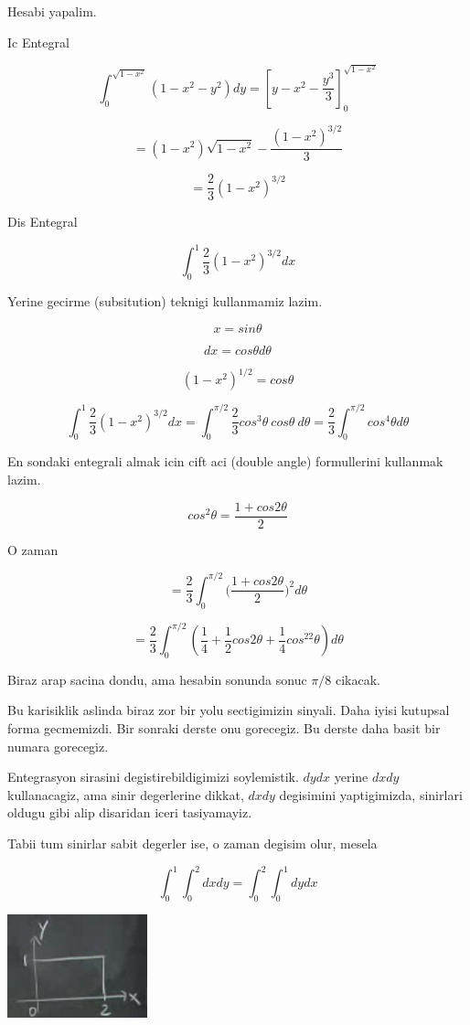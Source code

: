 \documentclass[12pt,fleqn]{article}
\begin{document}
Hesabi yapalim. 

Ic Entegral 

\[  \int_0^{\sqrt{1-x^2}}  (1-x^2-y^2) dy = 
[ y - x^2 - \frac{y^3}{3} ]_0^{\sqrt{1-x^2}}
 \]

\[ =  (1-x^2)\sqrt{1-x^2} - \frac{(1-x^2)^{3/2}}{3}\]

\[ = \frac{2}{3} (1-x^2)^{3/2} \]

Dis Entegral

\[ \int_0^1 \frac{2}{3} (1-x^2)^{3/2} dx \]

Yerine gecirme (subsitution) teknigi kullanmamiz lazim. 

\[ x = sin\theta \]

\[ dx = cos\theta d\theta\]

\[ (1-x^2)^{1/2} = cos\theta \]

\[ 
\int_0^1 \frac{2}{3} (1-x^2)^{3/2} dx = 
\int_0^{\pi/2} \frac{2}{3} cos^3\theta \ cos\theta \ d\theta = 
\frac{2}{3} \int_0^{\pi/2} cos^4\theta d\theta
\]

En sondaki entegrali almak icin cift aci (double angle) formullerini
kullanmak lazim. 

\[ cos^2\theta = \frac{1 + cos 2\theta}{2} \]

O zaman 

\[ = 
\frac{2}{3} \int_0^{\pi/2} 
\bigg( \frac{1 + cos 2\theta}{2} \bigg)^2 d\theta 
\]

\[ = \frac{2}{3} \int_0^{\pi/2} (
\frac{1}{4} + 
\frac{1}{2}cos2\theta + 
\frac{1}{4}cos^22\theta)d\theta
 \]

Biraz arap sacina dondu, ama hesabin sonunda sonuc $\pi/8$ cikacak. 

Bu karisiklik aslinda biraz zor bir yolu sectigimizin sinyali. Daha iyisi
kutupsal forma gecmemizdi. Bir sonraki derste onu gorecegiz. Bu derste daha
basit bir numara gorecegiz. 

Entegrasyon sirasini degistirebildigimizi soylemistik. $dy dx$ 
yerine $dx
dy$ kullanacagiz, ama sinir degerlerine dikkat, $dx dy$ degisimini
yaptigimizda, sinirlari oldugu gibi alip disaridan iceri tasiyamayiz. 

Tabii tum sinirlar sabit degerler ise, o zaman degisim olur, mesela

\[ \int_0^1 \int_0^2 dx dy =
\int_0^2 \int_0^1 dy dx
\]


\includegraphics[height=3cm]{16_12.png}
\end{document}
